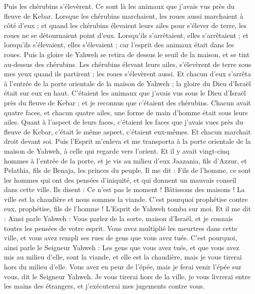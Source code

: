 \begin{multicols}{2}
Puis les chérubins s'élevèrent. Ce sont là les animaux que j'avais vus près du fleuve de Kebar.
Lorsque les chérubins marchaient, les roues aussi marchaient à côté d'eux ; et quand les chérubins élevaient leurs ailes pour s'élever de terre, les roues ne se détournaient point d'eux.
Lorsqu'ils s'arrêtaient, elles s'arrêtaient ; et lorsqu'ils s'élevaient, elles s'élevaient ; car l'esprit des animaux était dans les roues.
Puis la gloire de Yahweh se retira de dessus le seuil de la maison, et se tint au-dessus des chérubins.
Les chérubins élevant leurs ailes, s'élevèrent de terre sous mes yeux quand ils partirent ; les roues s'élevèrent aussi. Et chacun d'eux s'arrêta à l'entrée de la porte orientale de la maison de Yahweh ; la gloire du Dieu d'Israël était sur eux en haut.
C'étaient les animaux que j'avais vus sous le Dieu d'Israël près du fleuve de Kebar ; et je reconnus que c'étaient des chérubins.
Chacun avait quatre faces, et chacun quatre ailes, une forme de main d'homme était sous leurs ailes.
Quant à l'aspect de leurs faces, c'étaient les faces que j'avais vues près du fleuve de Kebar, c'était le même aspect, c'étaient eux-mêmes. Et chacun marchait droit devant soi.
\VerseOne{}Puis l'Esprit m'enleva et me transporta à la porte orientale de la maison de Yahweh, à celle qui regarde vers l'orient. Et il y avait vingt-cinq hommes à l'entrée de la porte, et je vis au milieu d'eux Jaazania, fils d'Azzur, et Pelathia, fils de Benaja, les princes du peuple.
Il me dit : Fils de l'homme, ce sont les hommes qui ont des pensées d'iniquité, et qui donnent un mauvais conseil dans cette ville.
Ils disent : Ce n'est pas le moment ! Bâtissons des maisons ! La ville est la chaudière et nous sommes la viande.
C'est pourquoi prophétise contre eux, prophétise, fils de l'homme !
L'Esprit de Yahweh tomba sur moi. Et il me dit : Ainsi parle Yahweh : Vous parlez de la sorte, maison d'Israël, et je connais toutes les pensées de votre esprit.
Vous avez multiplié les meurtres dans cette ville, et vous avez rempli ses rues de gens que vous avez tués.
C'est pourquoi, ainsi parle le Seigneur Yahweh : Les gens que vous avez tués, et que vous avez mis au milieu d'elle, sont la viande, et elle est la chaudière, mais je vous tirerai hors du milieu d'elle.
Vous avez eu peur de l'épée, mais je ferai venir l'épée sur vous, dit le Seigneur Yahweh.
Je vous tirerai hors de la ville, je vous livrerai entre les mains des étrangers, et j'exécuterai mes jugements contre vous.

\end{multicols}
